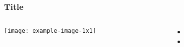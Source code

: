 \documentclass[14pt,handout,t]{beamer}
\begin{document}
\begin{frame}
\frametitle{\textbf{Title}}
  \begin{columns}[T]
    \begin{column}{0.3\textwidth}
      \texttt{[image: example-image-1x1]}
    \end{column}
    \begin{column}{11cm}
      \begin{itemize}
        \item \lipsum[2]
        \item \lipsum[3]
      \end{itemize}
    \end{column}
  \end{columns}
\end{frame}
\end{document}
